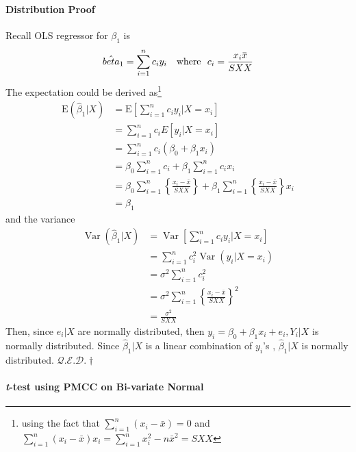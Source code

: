 \documentclass[11pt]{article}
\newcommand{\qed}{\hfill $\mathcal{Q}.\mathcal{E}.\mathcal{D}.\dagger$}
\newcommand{\overbar}[1]{\mkern 1.5mu\overline{\mkern-1.5mu#1\mkern-1.5mu}\mkern 1.5mu}
\begin{document}
\paragraph{Distribution Proof}
Recall OLS regressor for $\beta_1$ is
\begin{equation*}
    \hat{beta}_1 = \sum_{i = 1}^n c_iy_i \quad \text{where}~~ c_i = \frac{x_i \overbar{x}}{SXX}
\end{equation*}
The expectation could be derived as\footnote{using the fact that $\sum_{i=1}^{n}\left(x_{i}-\bar{x}\right)=0$ and $\sum_{i=1}^{n}\left(x_{i}-\bar{x}\right) x_{i}=\sum_{i=1}^{n} x_{i}^{2}-n \bar{x}^{2}=S X X$}
\begin{align*}
    \mathrm{E}\left(\hat{\beta}_{1} | X\right) &=\mathrm{E}\left[\sum_{i=1}^{n} c_{i} y_{i} | X=x_{i}\right] \\ &=\sum_{i=1}^{n} c_{i} E\left[y_{i} | X=x_{i}\right] \\ &=\sum_{i=1}^{n} c_{i}\left(\beta_{0}+\beta_{1} x_{i}\right) \\ &=\beta_{0} \sum_{i=1}^{n} c_{i}+\beta_{1} \sum_{i=1}^{n} c_{i} x_{i} \\ &=\beta_{0} \sum_{i=1}^{n}\left\{\frac{x_{i}-\bar{x}}{S X X}\right\}+\beta_{1} \sum_{i=1}^{n}\left\{\frac{x_{i}-\bar{x}}{S X X}\right\} x_{i} \\ &=\beta_{1} 
\end{align*}
and the variance
\begin{align*}
    \operatorname{Var}\left(\hat{\beta}_{1} | X\right) &=\operatorname{Var}\left[\sum_{i=1}^{n} c_{i} y_{i} | X=x_{i}\right] \\ &=\sum_{i=1}^{n} c_{i}^{2} \operatorname{Var}\left(y_{i} | X=x_{i}\right) \\ &=\sigma^{2} \sum_{i=1}^{n} c_{i}^{2} \\ &=\sigma^{2} \sum_{i=1}^{n}\left\{\frac{x_{i}-\bar{x}}{S X X}\right\}^{2} \\ &=\frac{\sigma^{2}}{S X X}
\end{align*}
Then, since $e_i |X$ are normally distributed, then $y_i = \beta_{0}+\beta_{1} x_{i}+e_{i}, Y_{i} | X$ is normally distributed. Since $\hat{\beta}_{1} | X$ is a linear combination of $y_i$'s , $\hat{\beta}_1 | X$ is normally distributed. \qed


\paragraph{\color{Thistle} \textit{t}-test using PMCC on Bi-variate Normal \color{Black}}
\end{document}

